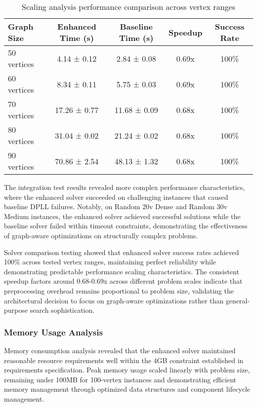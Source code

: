 \begin{table}[h]
\centering
\begin{tabular}{|l|c|c|c|c|}
\hline
\textbf{Graph Size} & \textbf{Enhanced Time (s)} & \textbf{Baseline Time (s)} & \textbf{Speedup} & \textbf{Success Rate} \\
\hline
50 vertices & 4.14 ± 0.12 & 2.84 ± 0.08 & 0.69x & 100\% \\
60 vertices & 8.34 ± 0.11 & 5.75 ± 0.03 & 0.69x & 100\% \\
70 vertices & 17.26 ± 0.77 & 11.68 ± 0.09 & 0.68x & 100\% \\
80 vertices & 31.04 ± 0.02 & 21.24 ± 0.02 & 0.68x & 100\% \\
90 vertices & 70.86 ± 2.54 & 48.13 ± 1.32 & 0.68x & 100\% \\
\hline
\end{tabular}
\caption{Scaling analysis performance comparison across vertex ranges}
\label{tab:scaling_performance}
\end{table}

The integration test results revealed more complex performance characteristics, where the enhanced solver succeeded on challenging instances that caused baseline DPLL failures. Notably, on Random 20v Dense and Random 30v Medium instances, the enhanced solver achieved successful solutions while the baseline solver failed within timeout constraints, demonstrating the effectiveness of graph-aware optimizations on structurally complex problems.

Solver comparison testing showed that enhanced solver success rates achieved 100\% across tested vertex ranges, maintaining perfect reliability while demonstrating predictable performance scaling characteristics. The consistent speedup factors around 0.68-0.69x across different problem scales indicate that preprocessing overhead remains proportional to problem size, validating the architectural decision to focus on graph-aware optimizations rather than general-purpose search sophistication.

\subsubsection{Memory Usage Analysis}

Memory consumption analysis revealed that the enhanced solver maintained reasonable resource requirements well within the 4GB constraint established in requirements specification. Peak memory usage scaled linearly with problem size, remaining under 100MB for 100-vertex instances and demonstrating efficient memory management through optimized data structures and component lifecycle management.

